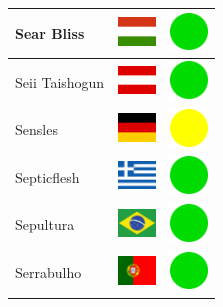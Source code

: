 \documentclass[12pt, a4paper, twoside]{report}
\begin{document}
\begin{center}
\begin{longtable}{|p{5cm}|p{2cm}|p{2cm}|}
 Sear Bliss                                                 & \includegraphics[width=1cm]{../img/flags/hu} &   \includegraphics[width=1cm]{../likes/y} \\ \hline
 Seii Taishogun                                             & \includegraphics[width=1cm]{../img/flags/at} &   \includegraphics[width=1cm]{../likes/y} \\ \hline
 Sensles                                                    & \includegraphics[width=1cm]{../img/flags/de} &   \includegraphics[width=1cm]{../likes/m} \\ \hline
 Septicflesh                                                & \includegraphics[width=1cm]{../img/flags/gr} &   \includegraphics[width=1cm]{../likes/y} \\ \hline
 Sepultura                                                  & \includegraphics[width=1cm]{../img/flags/br} &   \includegraphics[width=1cm]{../likes/y} \\ \hline
 Serrabulho                                                 & \includegraphics[width=1cm]{../img/flags/pt} &   \includegraphics[width=1cm]{../likes/y} \\ \hline

\end{longtable}
\end{center}
\end{document}
